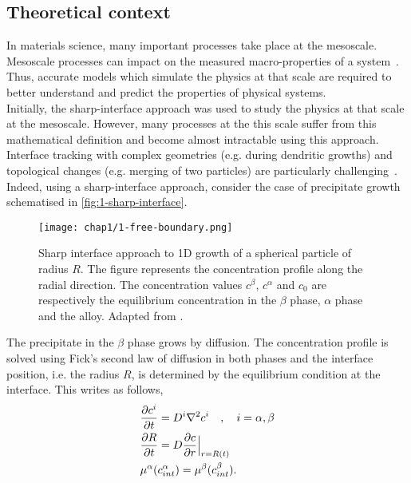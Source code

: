 \subsection{Theoretical context}
    In materials science, many important processes take place at the mesoscale. Mesoscale processes can impact on the measured macro-properties of a system\ \cite{MoelansBlanpainWollants2008}. Thus, accurate models which simulate the physics at that scale are required to better understand and predict the properties of physical systems.\\
    Initially, the sharp-interface approach was used to study the physics at that scale at the mesoscale. However, many processes at the this scale suffer from this mathematical definition and become almost intractable using this approach. Interface tracking with complex geometries (e.g. during dendritic growths) and topological changes (e.g. merging of two particles) are particularly challenging\ \cite{Emmerich2008}.\\
    Indeed, using a sharp-interface approach, consider the case of precipitate growth schematised in \autoref{fig:1-sharp-interface}.
    \begin{figure}[H]
        \centering
        \texttt{[image: chap1/1-free-boundary.png]}
        \caption{Sharp interface approach to 1D growth of a spherical particle of radius $R$. The figure represents the concentration profile along the radial direction. The concentration values $c^\beta$, $c^\alpha$ and $c_0$ are respectively the equilibrium concentration in the $\beta$ phase, $\alpha$ phase and the alloy. Adapted from \cite{Voorhees2018,MoelansBlanpainWollants2008}.}
        \label{fig:1-sharp-interface}
    \end{figure}
    The precipitate in the $\beta$ phase grows by diffusion. The concentration profile is solved using Fick's second law of diffusion \cite{Gottstein2004} in both phases and the interface position, i.e. the radius $R$, is determined by the equilibrium condition at the interface. This writes as follows,
    \begin{equation}
        \begin{aligned}
            &\frac{\partial c^i}{\partial t} = D^i \nabla^2 c^i\quad,\quad i=\alpha, \beta\\
            &\frac{\partial R}{\partial t} = D \frac{\partial c}{\partial r}\Bigl|_{r=R(t)}\\
            &\mu^\alpha(c^\alpha_{int}) = \mu^\beta(c^\beta_{int}).
        \end{aligned}
    \end{equation}
